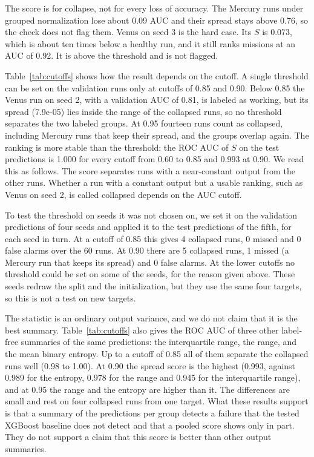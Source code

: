 \documentclass{IEEEtaes}
\begin{document}
The score is for collapse, not for every loss of accuracy. The Mercury runs under grouped normalization lose about 0.09 AUC and their spread stays above 0.76, so the check does not flag them. Venus on seed 3 is the hard case. Its $S$ is 0.073, which is about ten times below a healthy run, and it still ranks missions at an AUC of 0.92. It is above the threshold and is not flagged.

Table~\ref{tab:cutoffs} shows how the result depends on the cutoff. A single threshold can be set on the validation runs only at cutoffs of 0.85 and 0.90. Below 0.85 the Venus run on seed 2, with a validation AUC of 0.81, is labeled as working, but its spread (7.9e-05) lies inside the range of the collapsed runs, so no threshold separates the two labeled groups. At 0.95 fourteen runs count as collapsed, including Mercury runs that keep their spread, and the groups overlap again. The ranking is more stable than the threshold: the ROC AUC of $S$ on the test predictions is 1.000 for every cutoff from 0.60 to 0.85 and 0.993 at 0.90. We read this as follows. The score separates runs with a near-constant output from the other runs. Whether a run with a constant output but a usable ranking, such as Venus on seed 2, is called collapsed depends on the AUC cutoff.

To test the threshold on seeds it was not chosen on, we set it on the validation predictions of four seeds and applied it to the test predictions of the fifth, for each seed in turn. At a cutoff of 0.85 this gives 4 collapsed runs, 0 missed and 0 false alarms over the 60 runs. At 0.90 there are 5 collapsed runs, 1 missed (a Mercury run that keeps its spread) and 0 false alarms. At the lower cutoffs no threshold could be set on some of the seeds, for the reason given above. These seeds redraw the split and the initialization, but they use the same four targets, so this is not a test on new targets.

The statistic is an ordinary output variance, and we do not claim that it is the best summary. Table~\ref{tab:cutoffs} also gives the ROC AUC of three other label-free summaries of the same predictions: the interquartile range, the range, and the mean binary entropy. Up to a cutoff of 0.85 all of them separate the collapsed runs well (0.98 to 1.00). At 0.90 the spread score is the highest (0.993, against 0.989 for the entropy, 0.978 for the range and 0.945 for the interquartile range), and at 0.95 the range and the entropy are higher than it. The differences are small and rest on four collapsed runs from one target. What these results support is that a summary of the predictions per group detects a failure that the tested XGBoost baseline does not detect and that a pooled score shows only in part. They do not support a claim that this score is better than other output summaries.
\end{document}
